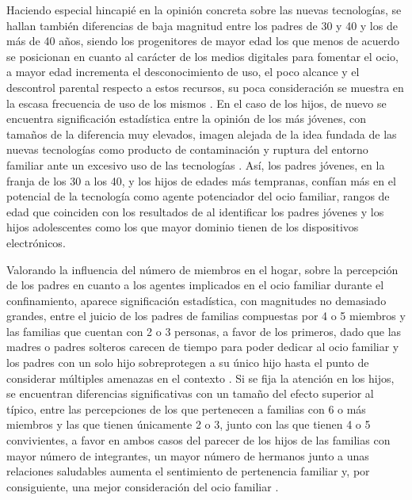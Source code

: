 \documentclass{textolivre}
\begin{document}
Haciendo especial hincapié en la opinión concreta sobre las nuevas tecnologías, se hallan también diferencias de baja magnitud entre los padres de 30 y 40 y los de más de 40 años, siendo los progenitores de mayor edad los que menos de acuerdo se posicionan en cuanto al carácter de los medios digitales para fomentar el ocio, a mayor edad incrementa el desconocimiento de uso, el poco alcance y el descontrol parental respecto a estos recursos, su poca consideración se muestra en la escasa frecuencia de uso de los mismos \cite{nikken2015, sanchez-valle2017}. En el caso de los hijos, de nuevo se encuentra significación estadística entre la opinión de los más jóvenes, con tamaños de la diferencia muy elevados, imagen alejada de la idea fundada de las nuevas tecnologías como producto de contaminación y ruptura del entorno familiar ante un excesivo uso de las tecnologías \cite{gamito2019}. Así, los padres jóvenes, en la franja de los 30 a los 40, y los hijos de edades más tempranas, confían más en el potencial de la tecnología como agente potenciador del ocio familiar, rangos de edad que coinciden con los resultados de \textcite{gonzalezfernandez2020} al identificar los padres jóvenes y los hijos adolescentes como los que mayor dominio tienen de los dispositivos electrónicos.

Valorando la influencia del número de miembros en el hogar, sobre la percepción de los padres en cuanto a los agentes implicados en el ocio familiar durante el confinamiento, aparece significación estadística, con magnitudes no demasiado grandes, entre el juicio de los padres de familias compuestas por 4 o 5 miembros y las familias que cuentan con 2 o 3 personas, a favor de los primeros, dado que las madres o padres solteros carecen de tiempo para poder dedicar al ocio familiar y los padres con un solo hijo sobreprotegen a su único hijo hasta el punto de considerar múltiples amenazas en el contexto \cite{townsend2017}. Si se fija la atención en los hijos, se encuentran diferencias significativas con un tamaño del efecto superior al típico, entre las percepciones de los que pertenecen a familias con 6 o más miembros y las que tienen únicamente 2 o 3, junto con las que tienen 4 o 5 convivientes, a favor en ambos casos del parecer de los hijos de las familias con mayor número de integrantes, un mayor número de hermanos junto a unas relaciones saludables aumenta el sentimiento de pertenencia familiar y, por consiguiente, una mejor consideración del ocio familiar \cite{oberg2017}.
\end{document}
